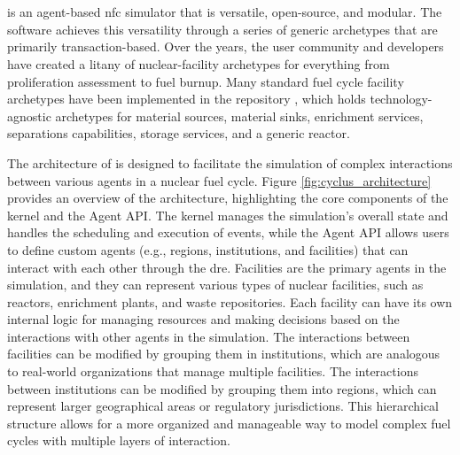 \section{\cyclus}
\label{sec:cyclus}
\cyclus \cite{huff_cyclus_intro_2016} is an agent-based \gls{nfc} simulator that is versatile, open-source, and modular. The software achieves this versatility through a series of generic archetypes that are primarily transaction-based. Over the years, the user community and developers have created a litany of nuclear-facility archetypes for everything from proliferation assessment to fuel burnup. Many standard fuel cycle facility archetypes have been implemented in the \cycamore repository \cite{Carlsen_cycamore_2014}, which holds technology-agnostic archetypes for material sources, material sinks, enrichment services, separations capabilities, storage services, and a generic reactor.

The architecture of \cyclus is designed to facilitate the simulation of complex interactions between various agents in a nuclear fuel cycle. Figure \ref{fig:cyclus_architecture} provides an overview of the architecture, highlighting the core components of the \cyclus kernel and the Agent API. The kernel manages the simulation's overall state and handles the scheduling and execution of events, while the Agent API allows users to define custom agents (e.g., regions, institutions, and facilities) that can interact with each other through the \gls{dre}. Facilities are the primary agents in the simulation, and they can represent various types of nuclear facilities, such as reactors, enrichment plants, and waste repositories. Each facility can have its own internal logic for managing resources and making decisions based on the interactions with other agents in the simulation. The interactions between facilities can be modified by grouping them in institutions, which are analogous to real-world organizations that manage multiple facilities. The interactions between institutions can be modified by grouping them into regions, which can represent larger geographical areas or regulatory jurisdictions. This hierarchical structure allows for a more organized and manageable way to model complex fuel cycles with multiple layers of interaction.

